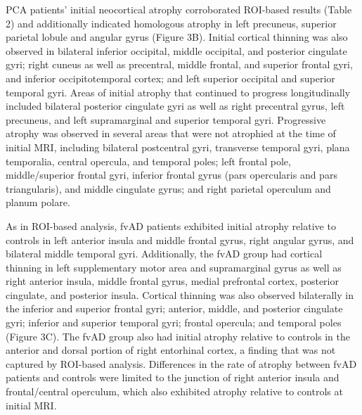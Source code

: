 \documentclass[]{article}
\begin{document}
PCA patients' initial neocortical atrophy corroborated ROI-based results
(Table 2) and additionally indicated homologous atrophy in left
precuneus, superior parietal lobule and angular gyrus (Figure 3B).
Initial cortical thinning was also observed in bilateral inferior
occipital, middle occipital, and posterior cingulate gyri; right cuneus
as well as precentral, middle frontal, and superior frontal gyri, and
inferior occipitotemporal cortex; and left superior occipital and
superior temporal gyri. Areas of initial atrophy that continued to
progress longitudinally included bilateral posterior cingulate gyri as
well as right precentral gyrus, left precuneus, and left supramarginal
and superior temporal gyri. Progressive atrophy was observed in several
areas that were not atrophied at the time of initial MRI, including
bilateral postcentral gyri, transverse temporal gyri, plana temporalia,
central opercula, and temporal poles; left frontal pole, middle/superior
frontal gyri, inferior frontal gyrus (pars opercularis and pars
triangularis), and middle cingulate gyrus; and right parietal operculum
and planum polare.

As in ROI-based analysis, fvAD patients exhibited initial atrophy
relative to controls in left anterior insula and middle frontal gyrus,
right angular gyrus, and bilateral middle temporal gyri. Additionally,
the fvAD group had cortical thinning in left supplementary motor area
and supramarginal gyrus as well as right anterior insula, middle frontal
gyrus, medial prefrontal cortex, posterior cingulate, and posterior
insula. Cortical thinning was also observed bilaterally in the inferior
and superior frontal gyri; anterior, middle, and posterior cingulate
gyri; inferior and superior temporal gyri; frontal opercula; and
temporal poles (Figure 3C). The fvAD group also had initial atrophy
relative to controls in the anterior and dorsal portion of right
entorhinal cortex, a finding that was not captured by ROI-based
analysis. Differences in the rate of atrophy between fvAD patients and
controls were limited to the junction of right anterior insula and
frontal/central operculum, which also exhibited atrophy relative to
controls at initial MRI.
\end{document}
